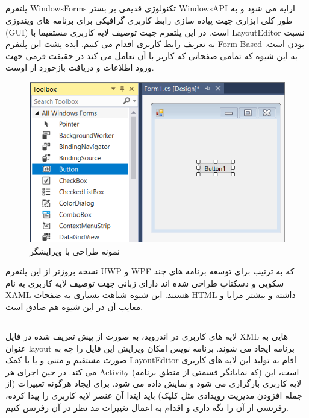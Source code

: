 \documentclass{CSICC2020}
\begin{document}
\subsection{}
\label{WindowsForms}
پلتفرم WindowsForms تکنولوژی قدیمی بر بستر WindowsAPI ارایه می شود و به طور کلی ابزاری جهت پیاده سازی رابط کاربری گرافیکی برای برنامه های ویندوزی (GUI) است.
در این پلتفرم جهت توصیف لایه کاربری مستقیما با LayoutEditor نسبت به تعریف رابط کاربری اقدام می کنیم.
ایده پشت این پلتفرم Form-Based بودن است. به این شیوه که تمامی صفحاتی که کاربر با آن تعامل می کند در حقیقت فرمی جهت ورود اطلاعات و دریافت بازخورد از اوست.

\begin{figure}
\includegraphics[width=\linewidth]{Images/winform}
\caption{نمونه طراحی با ویرایشگر }
\label{fig:WinForm}
\end{figure}

نسخه بروزتر از این پلتفرم UWP و WPF که به ترتیب برای توسعه برنامه های چند سکویی و دسکتاپ طراحی شده اند دارای زبانی جهت توصیف لایه کاربری به نام XAML هستند.
 این شیوه شباهت بسیاری به ضفحات HTML داشته و بیشتر مزایا و معایب آن در این شیوه هم صادق است.
\cite{winform}


\subsection{}
\label{Android}
لایه های کاربری در اندروید، به صورت از پیش تعریف شده در فایل XML هایی به عنوان layout برنامه ایجاد می شوند. برنامه نویس امکان ویرایش این فایل را چه به صورت مستقیم و متنی و یا با کمک LayoutEditor اقام به تولید این لایه های کاربری می کند.
در حین اجرای هر Activity (که نمایانگر قسمتی از منطق برنامه) است، این لایه کاربری بارگزاری می شود و نمایش داده می شود.
برای ایجاد هرگونه تغییرات (از جمله افزودن مدیریت رویدادی مثل کلیک) باید ایتدا آن عنصر لایه کاربری را پیدا کرده، رفرنسی از آن را نگه داری و اقدام به اعمال تغییرات مد نظر در آن رفرنس کنیم.\cite{androidlayout}
\end{document}
